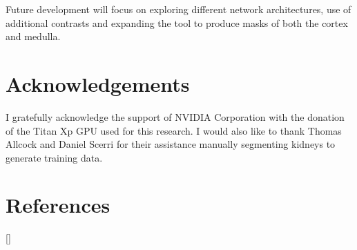 Future development will focus on exploring different network architectures, use of additional contrasts and expanding the tool to produce masks of both the cortex and medulla.

\section{Acknowledgements}

I gratefully acknowledge the support of NVIDIA Corporation with the donation of the Titan Xp GPU used for this research. I would also like to thank Thomas Allcock and Daniel Scerri for their assistance manually segmenting kidneys to generate training data.

\newpage
\section{References}
[\refname]{}
\printbibliography